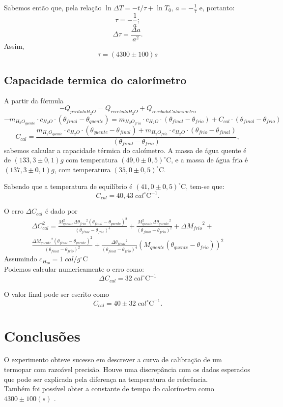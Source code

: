 \documentclass[12pt,a4paper]{article}
\begin{document}
Sabemos então que, pela relação $ \ln \Delta T = -t/\tau + \ln T_0 $, $a = -\frac{1}{\tau}$ e, portanto:
$$ \tau = -\frac{1}{a}; $$
$$ \Delta\tau =\frac{\Delta a}{a^2}. $$
Assim, 
$$ \tau = (4300 \pm 100)s $$
\subsection{Capacidade termica do calorímetro}

A partir da fórmula
$$-Q_{perdido H_2O} = Q_{recebido H_2O} + Q_{recebido Calorimetro}$$
$$-m_{H_2O_{quente}}\cdot c_{H_2O} \cdot (\theta_{final}-\theta_{quente}) = m_{H_2O_{fria}}\cdot c_{H_2O} \cdot (\theta_{final}-\theta_{frio}) + C_{cal}\cdot (\theta_{final}-\theta_{frio}) $$
$$C_{cal} = \frac{m_{H_2O_{quente}}\cdot c_{H_2O}\cdot(\theta_{quente} - \theta_{final}) + m_{H_2O_{fria}}\cdot c_{H_2O}\cdot(\theta_{frio} - \theta_{final})}{(\theta_{final}-\theta_{frio})},$$
sabemos calcular a capacidade térmica do caloímetro.
A massa de água quente é de $(133,3 \pm 0,1)g$ com temperatura $(49,0 \pm 0,5)^{\circ}\mathrm{C}$, e a massa de água fria é $(137,3 \pm 0,1)g$, com temperatura $(35,0 \pm 0,5)^{\circ}\mathrm{C}$.

Sabendo que a temperatura de equilíbrio é $(41,0 \pm 0,5)^{\circ}\mathrm{C}$, tem-se que:
$$C_{cal} = 40,43 \;cal ^{\circ}\mathrm{C}^{-1}. $$


O erro $ \Delta C_{cal} $ é dado por 
\begin{multline*}
\Delta C_{cal}^2 =  \frac{M_{{quente}}^{2} \Delta{\theta_{{frio}}}^{2} \left(\theta_{{final}} - \theta_{{quente}}\right)^{2}}{\left(\theta_{{final}} - \theta_{{frio}}\right)^{4}} + \frac{M_{{quente}}^{2} \Delta{\theta_{{quente}}}^{2}}{\left(\theta_{{final}} - \theta_{{frio}}\right)^{2}} + \Delta{M_{{frio}}}^{2} +\\ \frac{\Delta{M_{{quente}}}^{2} \left(\theta_{{final}} - \theta_{{quente}}\right)^{2}}{\left(\theta_{{final}} - \theta_{{frio}}\right)^{2}} + \frac{\Delta{\theta_{{final}}}^{2}}{\left(\theta_{{final}} - \theta_{{frio}}\right)^{4}} \left( M_{{quente}}( \theta_{{quente}} - \theta_{{frio}})\right)^{2}
\end{multline*}
Assumindo $c_{H_20} = 1 \;cal/g^{\circ}\mathrm{C}$ \\
Podemos calcular numericamente o erro como:
$$ \Delta C_{cal} = 32 \; cal ^{\circ}\mathrm{C}^{-1}$$

O valor final pode ser escrito como 
$$C_{cal} = 40 \pm 32 \;cal ^{\circ}\mathrm{C}^{-1}. $$

\section{Conclusões}
O experimento obteve sucesso em descrever a curva de calibração de um termopar com razoável precisão. Houve uma discrepância com os dados esperados que pode ser explicada pela diferença na temperatura de referência.\\
Também foi possível obter a constante de tempo do calorímetro como $4300 \pm 100 (s)$ .
\end{document}
